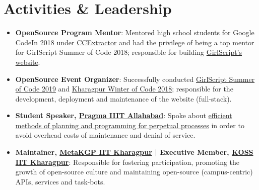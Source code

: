 \documentclass[a4paper,10pt]{extarticle} %
\begin{document}
\section{\textcolor{primary}{Activities \& Leadership}}

\begin{itemize}[leftmargin=0.55cm, rightmargin=0.2cm, label={\Large\textbullet}]
\item \textbf{OpenSource Program Mentor}: Mentored high school students for Google CodeIn 2018 under \href{https://codein.withgoogle.com/organizations/ccextractor-development/}{CCExtractor} and had the privilege of being a top mentor for GirlScript Summer of Code 2018; responsible for building \href{https://github.com/GirlScriptSummerOfCode/GirlScript_India}{GirlScript's website}.
\item \textbf{OpenSource Event Organizer}: Successfully conducted \href{https://gssoc.tech/}{GirlScript Summer of Code 2019} and \href{https://kwoc.kossiitkgp.org/}{Kharagpur Winter of Code 2018}; responsible for the development, deployment and maintenance of the website (full-stack). 
\item \textbf{Student Speaker, \href{http://pragmaconf.tech}{Pragma IIIT Allahabad}}: Spoke about \href{https://prezi.com/view/tf50MBbGtm9FgPKQfieI/}{efficient methods of planning and programming for perpetual processes} in order to avoid overhead costs of maintenance and denial of service. 
\item \textbf{Maintainer, \href{https://wiki.metakgp.org/w/Metakgp:About}{MetaKGP IIT Kharagpur} | Executive Member, \href{https://kossiitkgp.org/about/index.html}{KOSS IIT Kharagpur}}: Responsible for fostering participation, promoting the growth of open-source culture and maintaining open-source (campus-centric) APIs, services and task-bots.
\end{itemize}


\end{document}
